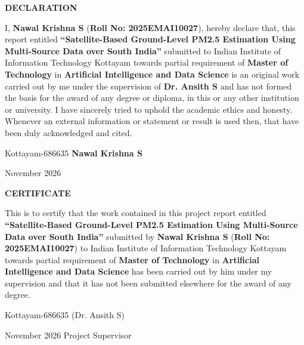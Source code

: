 \documentclass[12pt,a4wide]{report}
\theoremstyle{plain}
\theoremstyle{definition}
\theoremstyle{remark}
\begin{document}
\clearpage
 \setcounter{page}{2}
\begin{center}
{\large{\bf{DECLARATION}}}
\end{center}


\noindent I, \textbf{Nawal Krishna S} (\textbf{Roll No: 2025EMAI10027}), hereby declare that, this report entitled
\textbf{``Satellite-Based Ground-Level PM2.5 Estimation Using Multi-Source Data over South India''} submitted to Indian
Institute of Information Technology Kottayam towards partial
requirement of {\bf Master of Technology} in \textbf{Artificial Intelligence and Data Science}
is an original work carried out by me under the supervision of
\textbf{Dr. Ansith S} and has not formed the basis for the award
of any degree or diploma, in this or any other institution or
university. I have sincerely tried to uphold the academic ethics
and honesty. Whenever an external information or statement or
result is used then, that have been duly acknowledged and cited.

\vspace{4cm}

\noindent Kottayam-686635 \hfill \textbf{Nawal Krishna S}

\noindent November 2026

\clearpage


 \setcounter{page}{3}
\begin{center}
{\large{\bf{CERTIFICATE}}}
\end{center}


\noindent This is to certify that the work contained in this
project report entitled \textbf{``Satellite-Based Ground-Level PM2.5 Estimation Using Multi-Source Data over South India''}
submitted by \textbf{Nawal Krishna S} (\textbf{Roll No: 2025EMAI10027}) to Indian Institute of Information Technology Kottayam
towards partial requirement of {\bf Master of Technology} in
\textbf{Artificial Intelligence and Data Science} has been carried out by him under my
supervision and that it has not been submitted elsewhere for the
award of any degree.


\vspace{4cm}

\noindent Kottayam-686635  \hfill (Dr. Ansith S)

\noindent November 2026 \hfill Project Supervisor
\end{document}
